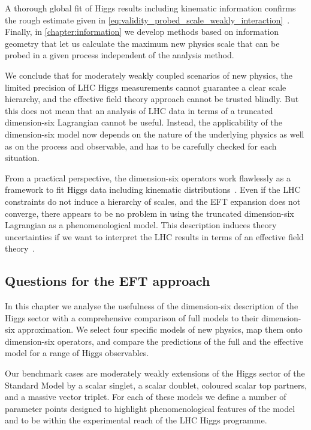 A thorough global fit of Higgs results including kinematic information
confirms the rough estimate given in
\autoref{eq:validity_probed_scale_weakly_interaction}~\cite{Corbett:2015ksa}. Finally,
in \autoref{chapter:information} we develop methods based on
information geometry that let us calculate the maximum new physics
scale that can be probed in a given process independent of the
analysis method.

We conclude that for moderately weakly coupled scenarios of new
physics, the limited precision of LHC Higgs measurements cannot
guarantee a clear scale hierarchy, and the effective field theory
approach cannot be trusted blindly. But this does not mean that an
analysis of LHC data in terms of a truncated dimension-six Lagrangian
cannot be useful. Instead, the applicability of the dimension-six
model now depends on the nature of the underlying physics as well as
on the process and observable, and has to be carefully checked for
each situation.

From a practical perspective, the dimension-six operators work
flawlessly as a framework to fit Higgs data including kinematic
distributions~\cite{Corbett:2015ksa}. Even if the LHC constraints do
not induce a hierarchy of scales, and the EFT expansion does not
converge, there appears to be no problem in using the truncated
dimension-six Lagrangian as a phenomenological model. This description
induces theory uncertainties if we want to interpret the LHC results
in terms of an effective field theory~\cite{Berthier:2015gja}.



\subsection{Questions for the EFT approach}

In this chapter we analyse the usefulness of the dimension-six
description of the Higgs sector with a comprehensive comparison of
full models to their dimension-six approximation. We select four
specific models of new physics, map them onto dimension-six operators,
and compare the predictions of the full and the effective model for a
range of Higgs observables.

Our benchmark cases are moderately weakly extensions of the Higgs
sector of the Standard Model by a scalar singlet, a scalar doublet,
coloured scalar top partners, and a massive vector triplet.  For each
of these models we define a number of parameter points designed to
highlight phenomenological features of the model and to be within the
experimental reach of the LHC Higgs programme.


